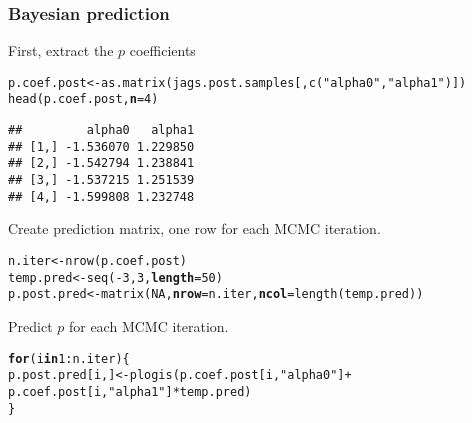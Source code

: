 \documentclass[color=usenames,dvipsnames]{beamer}\usepackage[]{graphicx}\usepackage[]{color}
\makeatletter
\newcommand{\hlnum}[1]{\textcolor[rgb]{0.69,0.494,0}{#1}}%
\newcommand{\hlstr}[1]{\textcolor[rgb]{0.749,0.012,0.012}{#1}}%
\newcommand{\hlopt}[1]{\textcolor[rgb]{0,0,0}{#1}}%
\newcommand{\hlstd}[1]{\textcolor[rgb]{0,0,0}{#1}}%
\newcommand{\hlkwa}[1]{\textcolor[rgb]{0,0,0}{\textbf{#1}}}%
\newcommand{\hlkwb}[1]{\textcolor[rgb]{0,0.341,0.682}{#1}}%
\newcommand{\hlkwc}[1]{\textcolor[rgb]{0,0,0}{\textbf{#1}}}%
\newcommand{\hlkwd}[1]{\textcolor[rgb]{0.004,0.004,0.506}{#1}}%
\newenvironment{kframe}{%
 \def\at@end@of@kframe{}%
 \ifinner\ifhmode%
  \def\at@end@of@kframe{\end{minipage}}%
  \begin{minipage}{\columnwidth}%
 \fi\fi%
 \def\FrameCommand##1{\hskip\@totalleftmargin \hskip-\fboxsep
 \colorbox{shadecolor}{##1}\hskip-\fboxsep
     \hskip-\linewidth \hskip-\@totalleftmargin \hskip\columnwidth}%
 \MakeFramed {\advance\hsize-\width
   \@totalleftmargin\z@ \linewidth\hsize
   \@setminipage}}%
 {\par\unskip\endMakeFramed%
 \at@end@of@kframe}
\newenvironment{knitrout}{}{} %
\newcommand{\inr}[1]{\colorbox{inlinecolor}{\texttt{#1}}}
\makeatother
\begin{document}
\begin{frame}[fragile]
  \frametitle{Bayesian prediction}
  \small
  First, extract the $p$ coefficients
  \vspace{-6pt}
\begin{knitrout}\scriptsize
{}\color{fgcolor}\begin{kframe}
\begin{alltt}
\hlstd{p.coef.post} \hlkwb{<-} \hlkwd{as.matrix}\hlstd{(jags.post.samples[,}\hlkwd{c}\hlstd{(}\hlstr{"alpha0"}\hlstd{,}\hlstr{"alpha1"}\hlstd{)])}
\hlkwd{head}\hlstd{(p.coef.post,} \hlkwc{n}\hlstd{=}\hlnum{4}\hlstd{)}
\end{alltt}
\begin{verbatim}
##         alpha0   alpha1
## [1,] -1.536070 1.229850
## [2,] -1.542794 1.238841
## [3,] -1.537215 1.251539
## [4,] -1.599808 1.232748
\end{verbatim}
\end{kframe}
\end{knitrout}
  \pause
  \vfill
  Create prediction matrix, one row for each MCMC iteration.
  \vspace{-6pt}
\begin{knitrout}\scriptsize
{}\color{fgcolor}\begin{kframe}
\begin{alltt}
\hlstd{n.iter} \hlkwb{<-} \hlkwd{nrow}\hlstd{(p.coef.post)}
\hlstd{temp.pred} \hlkwb{<-} \hlkwd{seq}\hlstd{(}\hlopt{-}\hlnum{3}\hlstd{,} \hlnum{3}\hlstd{,} \hlkwc{length}\hlstd{=}\hlnum{50}\hlstd{)}
\hlstd{p.post.pred} \hlkwb{<-} \hlkwd{matrix}\hlstd{(}\hlnum{NA}\hlstd{,} \hlkwc{nrow}\hlstd{=n.iter,} \hlkwc{ncol}\hlstd{=}\hlkwd{length}\hlstd{(temp.pred))}
\end{alltt}
\end{kframe}
\end{knitrout}
  \pause
  \vfill
  Predict $p$ for each MCMC iteration.
  \vspace{-6pt}
\begin{knitrout}\scriptsize
{}\color{fgcolor}\begin{kframe}
\begin{alltt}
\hlkwa{for}\hlstd{(i} \hlkwa{in} \hlnum{1}\hlopt{:}\hlstd{n.iter) \{}
    \hlstd{p.post.pred[i,]} \hlkwb{<-} \hlkwd{plogis}\hlstd{(p.coef.post[i,}\hlstr{"alpha0"}\hlstd{]} \hlopt{+}
                              \hlstd{p.coef.post[i,}\hlstr{"alpha1"}\hlstd{]}\hlopt{*}\hlstd{temp.pred)}
\hlstd{\}}
\end{alltt}
\end{kframe}
\end{knitrout}
\end{frame}
\end{document}
